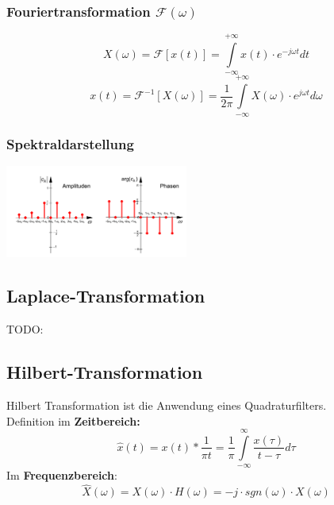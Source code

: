 \begin{multicols}{2}
  
  \subsubsection*{Fouriertransformation $\mathcal{F}(\omega)$}
  $$ X(\omega) = \mathcal{F}[x(t)] = \int \limits _{-\infty} ^{+\infty} x(t) \cdot e^{-j \omega t} dt $$
  $$ x(t) = \mathcal{F}^{-1}[X(\omega)] = \frac{1}{2 \pi} \int \limits _{- \infty} ^{+ \infty} X(\omega) \cdot e^{j \omega t} d\omega$$
  
  \subsubsection*{Spektraldarstellung}
  \includegraphics[width = 6cm]{include/Integraltransformationen/img/Spektrum.png}
\end{multicols}

\subsection{Laplace-Transformation}
TODO: %

\subsection{Hilbert-Transformation}
Hilbert Transformation ist die Anwendung eines Quadraturfilters. \\
Definition im \textbf{Zeitbereich:}
$$\hat{x}(t) = x(t) * \frac{1}{\pi t} = \frac{1}{\pi} \int \limits _{-\infty} ^{\infty} \frac{x(\tau)}{t-\tau} d\tau$$
Im \textbf{Frequenzbereich}:
$$\hat{X}(\omega) = X(\omega) \cdot H(\omega) = -j \cdot sgn(\omega) \cdot X(\omega)$$
